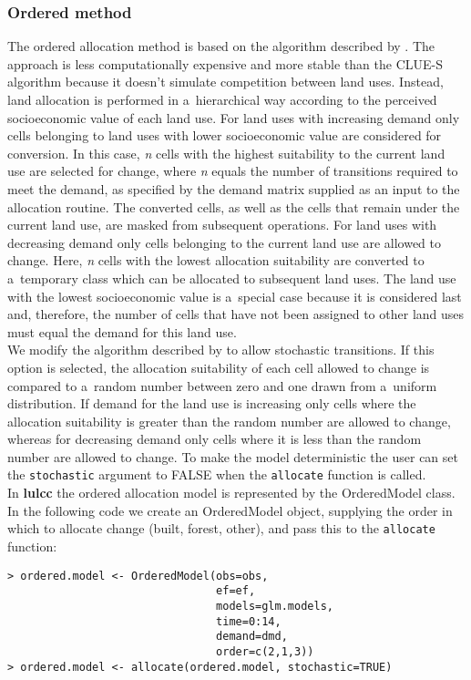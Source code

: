 \documentclass[gmdd, online, hvmath]{copernicus}
\begin{document}
\subsubsection{Ordered method}

The ordered allocation method is based on the algorithm described by \citet{fuchs2013}. The approach is less computationally expensive and more stable than the CLUE-S algorithm because it doesn't simulate competition between land uses. Instead, land allocation is performed in a~hierarchical way according to the perceived socioeconomic value of each land use. For land uses with increasing demand only cells belonging to land uses with lower socioeconomic value are considered for conversion. In this case, \textit{n} cells with the highest suitability to the current land use are selected for change, where \textit{n} equals the number of transitions required to meet the demand, as specified by the demand matrix supplied as an input to the allocation routine. The converted cells, as well as the cells that remain under the current land use, are masked from subsequent operations. For land uses with decreasing demand only cells belonging to the current land use are allowed to change. Here, \textit{n} cells with the lowest allocation suitability are converted to a~temporary class which can be allocated to subsequent land uses. The land use with the lowest socioeconomic value is a~special case because it is considered last and, therefore, the number of cells that have not been assigned to other land uses must equal the demand for this land use. \\

We modify the algorithm described by \citep{fuchs2013} to allow stochastic transitions. If this option is selected, the allocation suitability of each cell allowed to change is compared to a~random number between zero and one drawn from a~uniform distribution. If demand for the land use is increasing only cells where the allocation suitability is greater than the random number are allowed to change, whereas for decreasing demand only cells where it is less than the random number are allowed to change. To make the model deterministic the user can set the \texttt{stochastic} argument to FALSE when the \texttt{allocate} function is called. \\

In \textbf{lulcc} the ordered allocation model is represented by the OrderedModel class. In the following code we create an OrderedModel object, supplying the order in which to allocate change (built, forest, other), and pass this to the \texttt{allocate} function:
\begin{verbatim}
> ordered.model <- OrderedModel(obs=obs, 
                                ef=ef, 
                                models=glm.models, 
                                time=0:14, 
                                demand=dmd, 
                                order=c(2,1,3)) 
> ordered.model <- allocate(ordered.model, stochastic=TRUE)
\end{verbatim}
\end{document}

